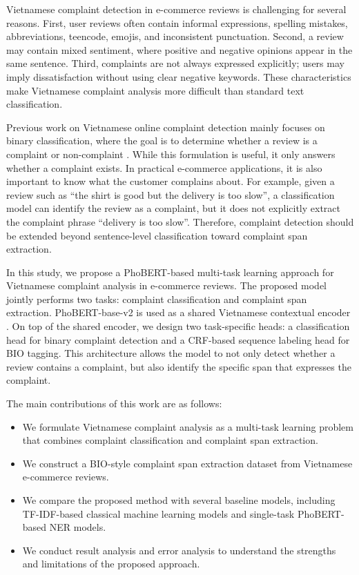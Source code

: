 \documentclass[11pt]{article}
\begin{document}
Vietnamese complaint detection in e-commerce reviews is challenging for several reasons. First, user reviews often contain informal expressions, spelling mistakes, abbreviations, teencode, emojis, and inconsistent punctuation. Second, a review may contain mixed sentiment, where positive and negative opinions appear in the same sentence. Third, complaints are not always expressed explicitly; users may imply dissatisfaction without using clear negative keywords. These characteristics make Vietnamese complaint analysis more difficult than standard text classification.

Previous work on Vietnamese online complaint detection mainly focuses on binary classification, where the goal is to determine whether a review is a complaint or non-complaint \citep{viocd2021}. While this formulation is useful, it only answers whether a complaint exists. In practical e-commerce applications, it is also important to know what the customer complains about. For example, given a review such as ``the shirt is good but the delivery is too slow'', a classification model can identify the review as a complaint, but it does not explicitly extract the complaint phrase ``delivery is too slow''. Therefore, complaint detection should be extended beyond sentence-level classification toward complaint span extraction.

In this study, we propose a PhoBERT-based multi-task learning approach for Vietnamese complaint analysis in e-commerce reviews. The proposed model jointly performs two tasks: complaint classification and complaint span extraction. PhoBERT-base-v2 is used as a shared Vietnamese contextual encoder \citep{phobert2020}. On top of the shared encoder, we design two task-specific heads: a classification head for binary complaint detection and a CRF-based sequence labeling head for BIO tagging. This architecture allows the model to not only detect whether a review contains a complaint, but also identify the specific span that expresses the complaint.

The main contributions of this work are as follows:
\begin{itemize}
    \item We formulate Vietnamese complaint analysis as a multi-task learning problem that combines complaint classification and complaint span extraction.
    \item We construct a BIO-style complaint span extraction dataset from Vietnamese e-commerce reviews.
    \item We compare the proposed method with several baseline models, including TF-IDF-based classical machine learning models and single-task PhoBERT-based NER models.
    \item We conduct result analysis and error analysis to understand the strengths and limitations of the proposed approach.
\end{itemize}
\end{document}
